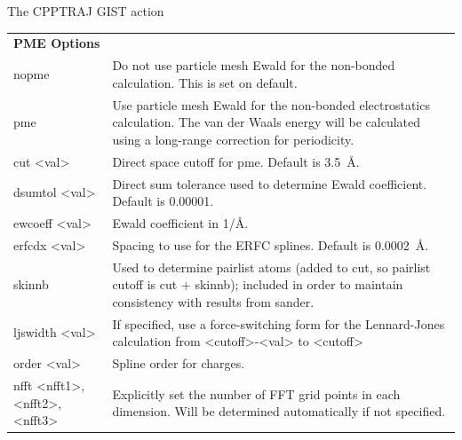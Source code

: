 \documentclass[9pt,tutorial]{livecoms}
\begin{document}
\begin{Checklists*}[h!]
\begin{checklist}{The CPPTRAJ GIST action}
\begin{tabularx}{\textwidth}{@{}l X @{} }
\textbf{PME Options} & \\
nopme & Do not use particle mesh Ewald for the non-bonded calculation. This is set  on default. \\
pme & Use particle mesh Ewald for the non-bonded electrostatics calculation. The van der Waals energy will be calculated using a long-range correction for periodicity.\\
\qquad cut <val> & Direct space cutoff for pme. Default is \SI{3.5}{\angstrom}.\\
\qquad dsumtol <val> & Direct sum tolerance used to determine Ewald coefficient. Default is 0.00001.\\
\qquad ewcoeff <val> & Ewald coefficient in 1/Å. \\
\qquad erfcdx <val> & Spacing to use for the ERFC splines. Default is \SI{0.0002}{\angstrom}. \\
\qquad skinnb & Used to determine pairlist atoms (added to cut, so pairlist cutoff is cut + skinnb); included in order to maintain consistency with results from sander. \\
\qquad ljswidth <val> & If specified, use a force-switching form for the Lennard-Jones calculation from <cutoff>-<val> to <cutoff> \\
\qquad order <val> & Spline order for charges. \\
\qquad nfft <nfft1>,<nfft2>,<nfft3> & Explicitly set the
number of FFT grid points in each dimension.
Will be determined automatically if not
specified. \\

\end{tabularx}  
\end{checklist}
\end{Checklists*}
\end{document}
